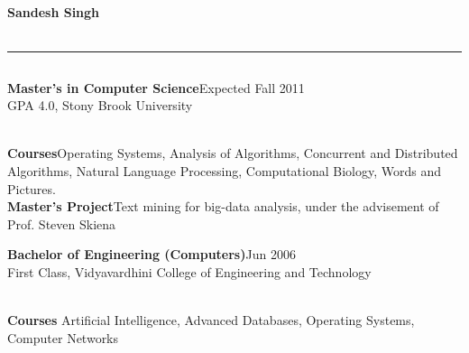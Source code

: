 \documentclass[a4paper,11pt,final]{article}
\newcommand{\resumetitle}[1]{%
  \subsection*{%
    \Large\sc{\textbf{#1}}%
  }%

}%
\newcommand{\eduexp}[3]{%
\noindent\textbf{#1}\hfill{#2}\normalsize\\{#3}\vspace{3pt}%
}
\newcommand{\resumedescheader}[1]{%
  \bigskip
  \resumetitle{#1}
}%
\begin{document}
\pagestyle{empty}

\begin{center}
  \centering\Large\textbf{Sandesh Singh}\normalsize \\
   \\
  \rule[2pt]{0.99\linewidth}{.1pt}
\end{center}

\vspace{-20pt}
\resumedescheader{Education}
\eduexp
	{Master's in Computer Science}
	{Expected Fall 2011}
	{GPA 4.0, Stony Brook University}
\\ \noindent \textbf{Courses}\quad Operating Systems, Analysis of Algorithms, Concurrent and Distributed Algorithms, Natural Language Processing, Computational Biology, Words and Pictures.
\\ \noindent \textbf{Master's Project}\quad Text mining for big-data analysis, under the advisement of Prof. Steven Skiena
\\
\vspace{-5pt}

\eduexp
	{Bachelor of Engineering (Computers)}
	{Jun 2006}
	{First Class, Vidyavardhini College of Engineering and Technology}
\\ \noindent \textbf{Courses} Artificial Intelligence, Advanced Databases, Operating Systems, Computer Networks
\end{document}
